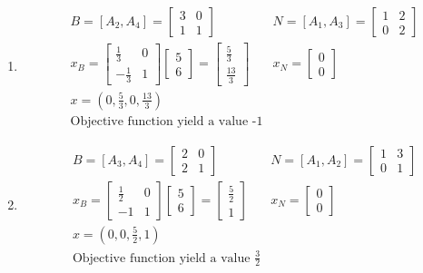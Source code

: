 \documentclass[11pt]{article}
\begin{document}
\begin{enumerate}
    \item \begin{align*}
        & B = [A_2, A_4]=\begin{bmatrix} 3 & 0 \\ 1 & 1\end{bmatrix} & N = [A_1, A_3]=\begin{bmatrix} 1 & 2 \\ 0 & 2\end{bmatrix}\\
        & x_B = \begin{bmatrix} \frac{1}{3} &  0 \\ -\frac{1}{3} & 1 \end{bmatrix} \begin{bmatrix} 5 \\ 6 \end{bmatrix} = \begin{bmatrix}  \frac{5}{3} \\ \frac{13}{3} \end{bmatrix} & x_N = \begin{bmatrix} 0 \\ 0\end{bmatrix} \\
        & x = (0, \frac{5}{3}, 0,\frac{13}{3}) &\\
        & \text{Objective function yield a value -1} &
    \end{align*}
    
    \item \begin{align*}
        & B = [A_3, A_4]=\begin{bmatrix} 2 & 0 \\ 2 & 1\end{bmatrix}& N = [A_1, A_2]=\begin{bmatrix} 1 & 3 \\ 0 & 1\end{bmatrix} \\
        & x_B = \begin{bmatrix} \frac{1}{2} & 0 \\ -1 & 1 \end{bmatrix} \begin{bmatrix} 5 \\ 6 \end{bmatrix} = \begin{bmatrix} \frac{5}{2} \\ 1 \end{bmatrix} & x_N = \begin{bmatrix} 0 \\ 0\end{bmatrix} \\
        & x = (0, 0, \frac{5}{2}, 1) &\\
        &\text{Objective function yield a value $\frac{3}{2}$} &
    \end{align*}
\end{enumerate}
\end{document}
